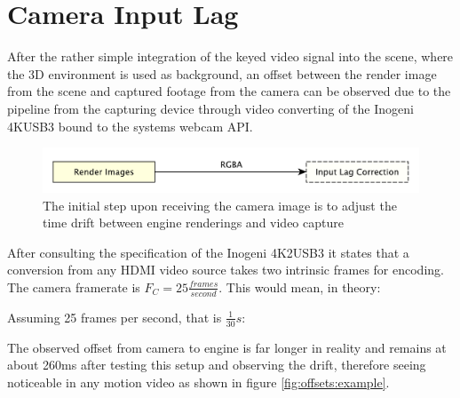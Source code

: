 %
\section{Camera Input Lag}

After the rather simple integration of the keyed video signal into the scene, 
where the 3D environment is used as background, an offset between the render 
image from the scene and captured footage from the camera can be observed due 
to the pipeline from the capturing device through video converting of the 
Inogeni 4KUSB3 bound to the systems webcam API.

\begin{figure}[htb]
	\includegraphics[width=\textwidth]{gfx/pipeline/4_2_swapper.pdf}
	\caption{The initial step upon receiving the camera image is to adjust the 
	time drift between engine renderings and video capture}
	\label{fig:steps:swapper}
\end{figure}

After consulting the specification of the Inogeni 4K2USB3 it states that a 
conversion from any HDMI video source takes two intrinsic frames for encoding. 
The camera framerate is $F_C = 25 \frac{frames}{second}$. This would mean, in 
theory:


Assuming 25 frames per second, that is $\frac{1}{30}s$:



The observed offset from camera to engine is far longer in reality and remains 
at about 260ms after testing this setup and observing the drift, therefore 
seeing noticeable in any motion video as shown in figure 
\ref{fig:offsets:example}.

